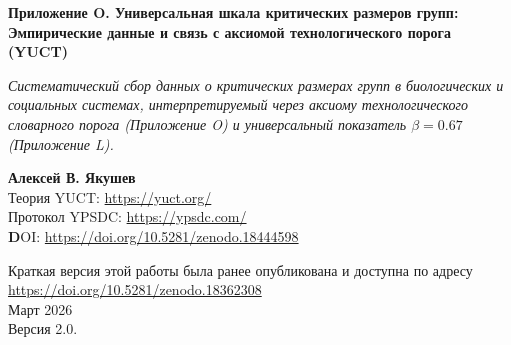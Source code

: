 \documentclass[12pt]{article}
\theoremstyle{remark}
\begin{document}
	
	\begin{titlepage}
		\begin{center}
			\vspace*{0.5cm}
			\Huge\textbf{Приложение O. Универсальная шкала критических размеров групп: \\ Эмпирические данные и связь с аксиомой технологического порога (YUCT)}
			
			\vspace{0.3cm}
			\small\textit{Систематический сбор данных о критических размерах групп в биологических и социальных системах, интерпретируемый через аксиому технологического словарного порога (Приложение O) и универсальный показатель $\beta = 0.67$ (Приложение L).}
			
			\vspace{0.3cm}
			\small\textbf{Алексей В. Якушев} \\
			Теория YUCT: \url{https://yuct.org/}\\
			Протокол YPSDC: \url{https://ypsdc.com/}\\
			
			\vspace{2cm}
			\textbf DOI: \url{https://doi.org/10.5281/zenodo.18444598}\\
			
			\vspace{1cm}
			
			\vspace{0cm}
			\large 
			Краткая версия этой работы была ранее опубликована и доступна по адресу\\ \url{https://doi.org/10.5281/zenodo.18362308}\\
			\vspace{1cm}
			Март 2026 \\ \large Версия 2.0.
			

\end{center}
\end{titlepage}
\end{document}
